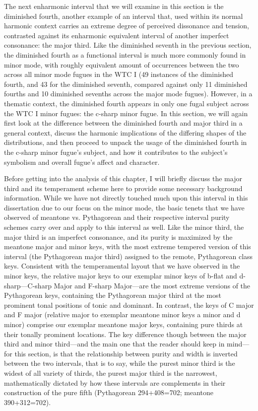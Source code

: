 The next enharmonic interval that we will examine in this section is the
diminished fourth, another example of an interval that, used within its
normal harmonic context carries an extreme degree of perceived
dissonance and tension, contrasted against its enharmonic equivalent
interval of another imperfect consonance: the major third. Like the
diminished seventh in the previous section, the diminished fourth as a
functional interval is much more commonly found in minor mode, with
roughly equivalent amount of occurrences between the two across all
minor mode fugues in the WTC I (49 instances of the diminished fourth,
and 43 for the diminished seventh, compared against only 11 diminished
fourths and 10 diminished sevenths across the major mode fugues).
However, in a thematic context, the diminished fourth appears in only
one fugal subject across the WTC I minor fugues: the c-sharp minor
fugue. In this section, we will again first look at the difference
between the diminished fourth and major third in a general context,
discuss the harmonic implications of the differing shapes of the
distributions, and then proceed to unpack the usage of the diminished
fourth in the c-sharp minor fugue's subject, and how it contributes to
the subject's symbolism and overall fugue's affect and character.

Before getting into the analysis of this chapter, I will briefly discuss
the major third and its temperament scheme here to provide some
necessary background information. While we have not directly touched
much upon this interval in this dissertation due to our focus on the
minor mode, the basic tenets that we have observed of meantone vs.
Pythagorean and their respective interval purity schemes carry over and
apply to this interval as well. Like the minor third, the major third is
an imperfect consonance, and its purity is maximized by the meantone
major and minor keys, with the most extreme tempered version of this
interval (the Pythagorean major third) assigned to the remote,
Pythagorean class keys. Consistent with the temperamental layout that we
have observed in the minor keys, the relative major keys to our exemplar
minor keys of b-flat and d-sharp---C-sharp Major and F-sharp
Major---are the most extreme versions of the Pythagorean keys,
containing the Pythagorean major third at the most prominent tonal
positions of tonic and dominant. In contrast, the keys of C major and F
major (relative major to exemplar meantone minor keys a minor and d
minor) comprise our exemplar meantone major keys, containing pure thirds
at their tonally prominent locations. The key difference though between
the major third and minor third---and the main one that the reader
should keep in mind---for this section, is that the relationship
between purity and width is inverted between the two intervals, that is
to say, while the purest minor third is the widest of all variety of
thirds, the purest major third is the narrowest, mathematically dictated
by how these intervals are complements in their construction of the pure
fifth (Pythagorean 294+408=702; meantone 390+312=702).

